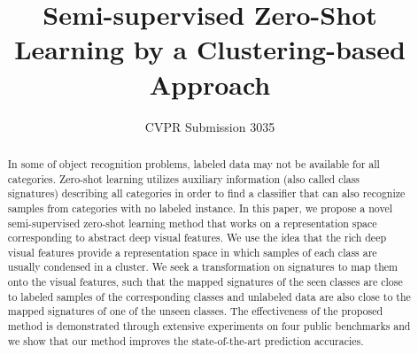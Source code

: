 \documentclass[10pt,twocolumn,letterpaper]{article}
\begin{document}
\title{Semi-supervised Zero-Shot Learning by a Clustering-based Approach}

\author{CVPR Submission 3035}

\maketitle

\begin{abstract}
In some of object recognition problems, labeled data may not be available for all categories. Zero-shot learning utilizes auxiliary information (also called class signatures) describing all categories in order to find a classifier that can also recognize samples
from categories with no labeled instance.
In this paper, we propose a novel semi-supervised zero-shot learning method that works on a representation space corresponding to abstract deep visual features. We use the idea that the rich deep visual features provide a representation space in which samples of each class are usually condensed in a cluster. We seek a transformation on signatures to map them onto the visual features, such that the mapped signatures of the seen classes are close to labeled samples of the corresponding classes and unlabeled data are also close to the mapped signatures of one of the unseen classes.
The effectiveness of the proposed method is demonstrated through extensive experiments on four public benchmarks and we show that our method improves the state-of-the-art prediction accuracies.

\end{abstract}
\end{document}
